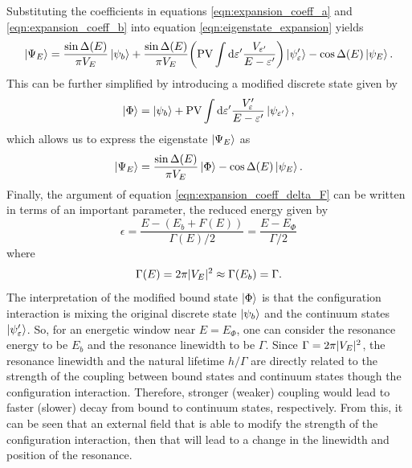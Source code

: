 Substituting the coefficients in equations \ref{eqn:expansion_coeff_a} and \ref{eqn:expansion_coeff_b} into equation \ref{eqn:eigenstate_expansion} yields
\begin{equation}
	\ket{\Psi_E}=\frac{\sin\Delta(E)}{\pi V_E}\ket{\psi_b}+\frac{\sin\Delta(E)}{\pi V_E}\bigg(\mathrm{PV}\int\mathop{}\!\mathrm{d}\varepsilon'\frac{V_{\varepsilon'}}{E-\varepsilon'}\bigg)\ket{\psi_\varepsilon'}-\cos\Delta(E)\ket{\psi_E}.
\end{equation}
This can be further simplified by  introducing a modified discrete state given by
\begin{equation}
	\ket{\Phi} = \ket{\psi_b}+\mathrm{PV}\int\mathop{}\!\mathrm{d} \varepsilon'\frac{V_\varepsilon'}{E-\varepsilon'}\ket{\psi_{\varepsilon'}},
\end{equation}
which allows us to express the eigenstate $\ket{\Psi_E}$ as
\begin{equation}
\label{eqn:eigen_with_a_b}
	\ket{\Psi_E}=\frac{\sin\Delta(E)}{\pi V_{E}}\ket{\Phi} - \cos\Delta(E)\ket{\psi_E}.
\end{equation}
Finally, the argument of equation \ref{eqn:expansion_coeff_delta_F} can be written in terms of an important parameter, the reduced energy given by
\begin{equation}
\label{eqn:normalized_eng}
	\epsilon = \frac{E-(E_b+F(E))}{\Gamma(E)/2} = \frac{E-E_\Phi}{\Gamma/2}
\end{equation}
where
\begin{equation}
	\Gamma(E) = 2\pi\lvert V_E \rvert^2\approx\Gamma(E_b)=\Gamma.
\end{equation}
The interpretation of the modified bound state $\ket{\Phi}$ is that the configuration interaction is mixing the original discrete state $\ket{\psi_b}$ and the continuum states $\ket{\psi_\varepsilon'}$. So, for an energetic window near $E=E_\Phi$, one can consider the resonance energy to be $E_b$ and the resonance linewidth to be $\Gamma$.  Since $\Gamma=2\pi\lvert V_E \rvert^2$, the resonance linewidth and the natural lifetime $h/\Gamma$ are directly related to the strength of the coupling between bound states and continuum states though the configuration interaction. Therefore, stronger (weaker) coupling would lead to faster (slower) decay from bound to continuum states, respectively.  From this, it can be seen that an external field that  is able to modify the strength of the configuration interaction, then that will lead to a change in the linewidth and position of the resonance.

